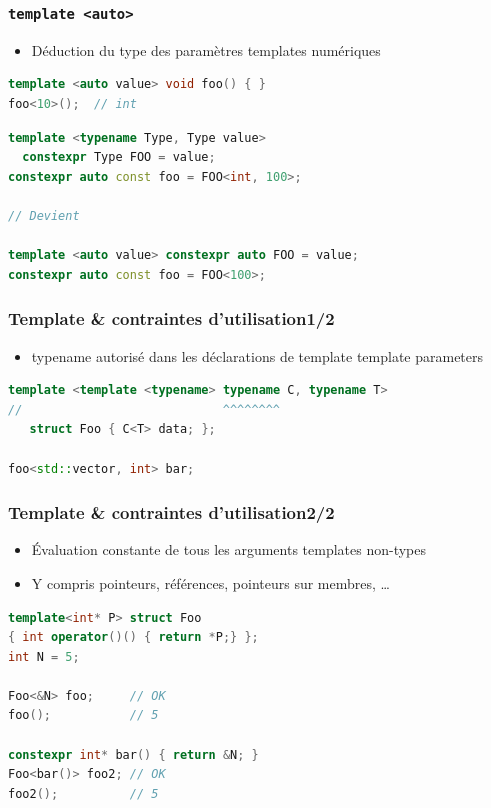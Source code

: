 \documentclass[C++.tex]{subfiles}
\begin{document}
\begin{frame}[fragile]
	\frametitle{\lstinline|template <auto>|}
	\begin{itemize}
		\item Déduction du type des paramètres templates numériques
	\end{itemize}

	\begin{lstlisting}[language=C++]
template <auto value> void foo() { }
foo<10>();  // int\end{lstlisting}

	\begin{lstlisting}[language=C++]
template <typename Type, Type value> 
  constexpr Type FOO = value;
constexpr auto const foo = FOO<int, 100>;

// Devient

template <auto value> constexpr auto FOO = value;
constexpr auto const foo = FOO<100>;
\end{lstlisting}

\end{frame}

\begin{frame}[fragile]
	\frametitle{Template \& contraintes d'utilisation\titlehfill{}1/2}
	\begin{itemize}
		\item typename autorisé dans les déclarations de template template parameters
	\end{itemize}

	\begin{lstlisting}[language=C++]
template <template <typename> typename C, typename T>
//                            ^^^^^^^^
   struct Foo { C<T> data; };

foo<std::vector, int> bar;\end{lstlisting}

\end{frame}

\begin{frame}[fragile]
	\frametitle{Template \& contraintes d'utilisation\titlehfill{}2/2}
	\begin{itemize}
		\item Évaluation constante de tous les arguments templates \og non-types\fg{}
		\item Y compris pointeurs, références, pointeurs sur membres, \ldots
	\end{itemize}

	\begin{lstlisting}[language=C++]
template<int* P> struct Foo
{ int operator()() { return *P;} };
int N = 5;

Foo<&N> foo;     // OK
foo();           // 5

constexpr int* bar() { return &N; }
Foo<bar()> foo2; // OK
foo2();          // 5\end{lstlisting}
\end{frame}
\end{document}

